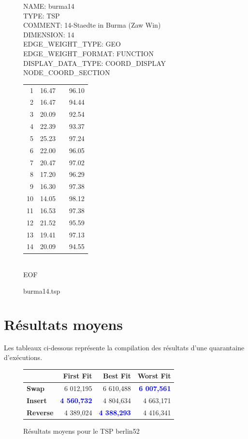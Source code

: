 \documentclass[a4paper,10pt]{report}
\begin{document}
\begin{figure}[h]

NAME: burma14\\
TYPE: TSP\\
COMMENT: 14-Staedte in Burma (Zaw Win)\\
DIMENSION: 14\\
EDGE\_WEIGHT\_TYPE: GEO\\
EDGE\_WEIGHT\_FORMAT: FUNCTION \\
DISPLAY\_DATA\_TYPE: COORD\_DISPLAY\\
NODE\_COORD\_SECTION\\
\begin{tabular}{rlcr}
 1&  16.47&&       96.10\\
 2&  16.47&&       94.44\\
 3&  20.09&&       92.54\\
 4&  22.39&&       93.37\\
 5&  25.23&&       97.24\\
 6&  22.00&&       96.05\\
 7&  20.47&&       97.02\\
 8&  17.20&&       96.29\\
 9&  16.30&&       97.38\\
10&  14.05&&       98.12\\
11&  16.53&&       97.38\\
12&  21.52&&       95.59\\
13&  19.41&&       97.13\\
14&  20.09&&       94.55\\
\end{tabular}
\\EOF
\caption{burma14.tsp}
\end{figure}


\section{Résultats moyens}

\paragraph{}
  Les tableaux ci-dessous représente la compilation des résultats d'une
quarantaine d'exécutions.

\begin{figure}[h]
  \begin{center}
    \begin{tabular}{|l|r|r|r|}
      \hline
      &		\textbf{First Fit}&	\textbf{Best Fit}&	\textbf{Worst
Fit}\\\hline
      \textbf{Swap}&
	  6 012,195&
	  6 610,488&
	  \textbf{\textcolor{blue}{6 007,561}}\\\hline
      \textbf{Insert}&
	  \textbf{\textcolor{blue}{4 560,732}}&
	  4 804,634&
	  4 663,171\\\hline
      \textbf{Reverse}&
	  4 389,024&
	  \textbf{\textcolor{blue}{4 388,293}}&
	  4 416,341\\\hline
    \end{tabular}
    \caption{Résultats moyens pour le TSP berlin52}
  \end{center}
\end{figure}
\end{document}

